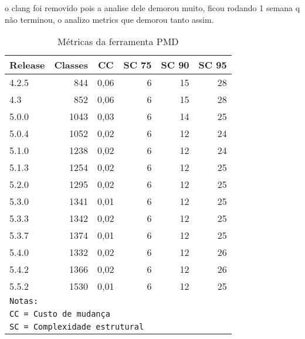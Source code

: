 o clang foi removido pois a analise dele demorou muito, ficou rodando 1 semana q não
terminou, o analizo metrics que demorou tanto assim.

\begin{table}[H]
\caption{Métricas da ferramenta PMD}
  \centering
\begin{tabular}{|l|r|r|r|r|r|}
\hline
\multicolumn{1}{|c|}{\textbf{Release}} & \multicolumn{1}{c|}{\textbf{Classes}} & \multicolumn{1}{c|}{\textbf{CC}} & \multicolumn{1}{c|}{\textbf{SC 75}} & \multicolumn{1}{c|}{\textbf{SC 90}} & \multicolumn{1}{c|}{\textbf{SC 95}} \\ \hline
4.2.5 & 844 & 0,06 & 6 & 15 & 28 \\ \hline
4.3 & 852 & 0,06 & 6 & 15 & 28 \\ \hline
5.0.0 & 1043 & 0,03 & 6 & 14 & 25 \\ \hline
5.0.4 & 1052 & 0,02 & 6 & 12 & 24 \\ \hline
5.1.0 & 1238 & 0,02 & 6 & 12 & 24 \\ \hline
5.1.3 & 1254 & 0,02 & 6 & 12 & 25 \\ \hline
5.2.0 & 1295 & 0,02 & 6 & 12 & 25 \\ \hline
5.3.0 & 1341 & 0,01 & 6 & 12 & 25 \\ \hline
5.3.3 & 1342 & 0,02 & 6 & 12 & 25 \\ \hline
5.3.7 & 1374 & 0,01 & 6 & 12 & 25 \\ \hline
5.4.0 & 1332 & 0,02 & 6 & 12 & 26 \\ \hline
5.4.2 & 1366 & 0,02 & 6 & 12 & 26 \\ \hline
5.5.2 & 1530 & 0,01 & 6 & 12 & 25 \\ \hline
\multicolumn{6}{l}{\texttt{Notas:}} \\
\multicolumn{6}{l}{\texttt{CC = Custo de mudança}} \\
\multicolumn{6}{l}{\texttt{SC = Complexidade estrutural}} \\ \hline
\end{tabular}
\label{metricas-pmd}
\end{table}


